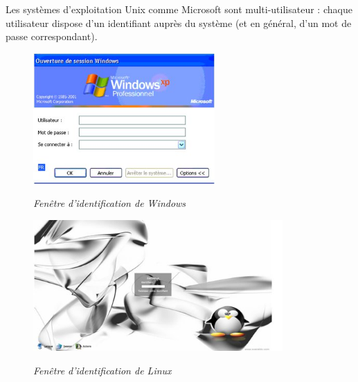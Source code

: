 \documentclass[11pt,oneside]{article}
\begin{document}
Les systèmes d'exploitation Unix comme Microsoft sont multi-utilisateur : chaque utilisateur
dispose d'un identifiant auprès du système (et en général, d’un mot de passe correspondant).

\begin{figure}[H]
\begin{minipage}[c]{.49\linewidth}
\begin{center}
\includegraphics[height=5cm]{images/loginWin.jpg}

\textit{Fenêtre d'identification de Windows}
\end{center}
\end{minipage} \hfill
\begin{minipage}[c]{.49\linewidth}
\begin{center}
\includegraphics[height=5cm]{images/loginLin.jpg}

\textit{Fenêtre d'identification de Linux}
\end{center}
\end{minipage}
\end{figure}

%
%
%
%
\end{document}
